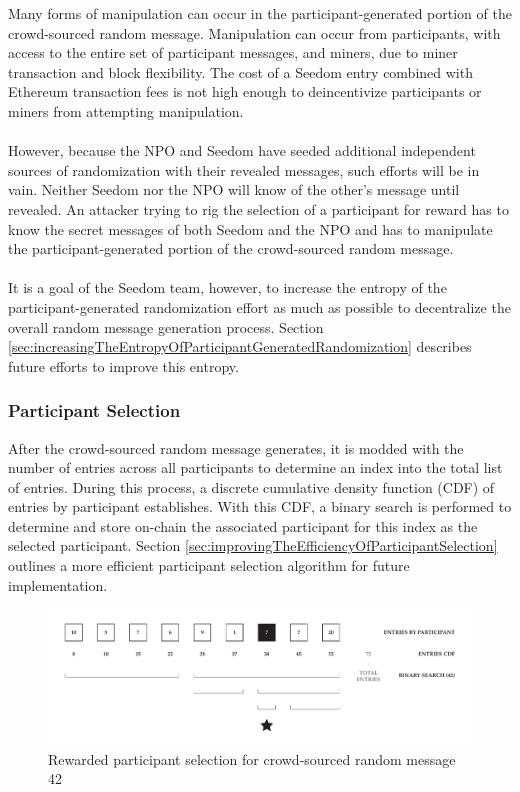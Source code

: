 \documentclass[11pt]{article}
\begin{document}
Many forms of manipulation can occur in the participant-generated portion of the crowd-sourced random message. Manipulation can occur from participants, with access to the entire set of participant messages, and miners, due to miner transaction and block flexibility. The cost of a Seedom entry combined with Ethereum transaction fees is not high enough to deincentivize participants or miners from attempting manipulation.\\\\
However, because the NPO and Seedom have seeded additional independent sources of randomization with their revealed messages, such efforts will be in vain. Neither Seedom nor the NPO will know of the other's message until revealed. An attacker trying to rig the selection of a participant for reward has to know the secret messages of both Seedom and the NPO and has to manipulate the participant-generated portion of the crowd-sourced random message.\\\\
It is a goal of the Seedom team, however, to increase the entropy of the participant-generated randomization effort as much as possible to decentralize the overall random message generation process. Section \ref{sec:increasingTheEntropyOfParticipantGeneratedRandomization} describes future efforts to improve this entropy.

\subsubsection{Participant Selection}

After the crowd-sourced random message generates, it is modded with the number of entries across all participants to determine an index into the total list of entries. During this process, a discrete cumulative density function (CDF) of entries by participant establishes. With this CDF, a binary search is performed to determine and store on-chain the associated participant for this index as the selected participant. Section \ref{sec:improvingTheEfficiencyOfParticipantSelection} outlines a more efficient participant selection algorithm for future implementation.

\begin{figure}[H]
\begin{center}
\includegraphics[width=1.0\textwidth]{./graphics/rewarded-participant-selection.pdf}
\caption{Rewarded participant selection for crowd-sourced random message 42}
\label{figure:participantSelection}
\end{center}
\end{figure}
\end{document}
